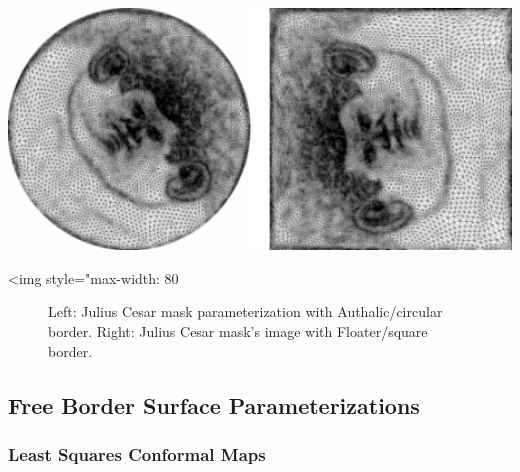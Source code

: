   \\
  \\
  \\
  \\

\begin{center}
    \label{Surface_mesh_parameterization-fig-circular_border}
    \begin{ccTexOnly}
        \includegraphics[width=1.0\textwidth]{Surface_mesh_parameterization/border}
    \end{ccTexOnly}
    \begin{ccHtmlOnly}
        <img style="max-width: 80%
    \end{ccHtmlOnly}
    \begin{figure}[ht]
        \caption{Left: Julius Cesar mask parameterization with
                 Authalic/circular border. Right: Julius Cesar mask's
                 image with Floater/square border.}
    \end{figure}
\end{center}



\subsection{Free Border Surface Parameterizations}

\subsubsection{Least Squares Conformal Maps}

